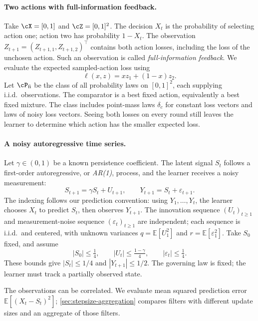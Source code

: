 \documentclass[11pt,twoside]{article}
\newcommand{\E}{\mathbb E}
\theoremstyle{definition}
\theoremstyle{remark}
\begin{document}
\paragraph{Two actions with full-information feedback.}
Take $\cX=[0,1]$ and $\cZ=[0,1]^2$. The decision $X_t$ is the
probability of selecting action one; action two has probability $1-X_t$.
The observation $Z_{t+1}=(Z_{t+1,1},Z_{t+1,2})^\top$ contains both
action losses, including the loss of the unchosen action. Such an
observation is called \emph{full-information feedback}. We evaluate the
expected sampled-action loss using
\begin{equation}
 \ell(x,z)=xz_1+(1-x)z_2.
 \label{eq:mixture-loss}
\end{equation}
Let $\cP_{\rm fi}$ be the class of all probability laws on $[0,1]^2$,
each supplying i.i.d.\ observations. The comparator is a best fixed action,
equivalently a best fixed mixture. The class includes point-mass laws
$\delta_c$ for constant loss vectors and laws of noisy loss vectors. Seeing both losses
on every round still leaves the learner to determine which action has the
smaller expected loss.

\paragraph{A noisy autoregressive time series.}
Let $\gamma\in(0,1)$ be a known persistence coefficient. The latent signal
$S_t$ follows a first-order autoregressive, or \emph{AR(1)}, process, and
the learner receives a noisy measurement:
\begin{equation}
 S_{t+1}=\gamma S_t+U_{t+1},\qquad
 Y_{t+1}=S_t+\varepsilon_{t+1}.
 \label{eq:ar-model}
\end{equation}
The indexing follows our prediction convention: using $Y_1,\ldots,Y_t$,
the learner chooses $X_t$ to predict $S_t$, then observes $Y_{t+1}$.
The innovation sequence $(U_t)_{t\ge1}$ and measurement-noise sequence
$(\varepsilon_t)_{t\ge1}$ are independent; each sequence is i.i.d.\ and
centered, with unknown variances $q=\E[U_1^2]$ and
$r=\E[\varepsilon_1^2]$. Take $S_0$ fixed, and assume
\[
 |S_0|\le\tfrac14,\qquad |U_t|\le\tfrac{1-\gamma}{4},\qquad
 |\varepsilon_t|\le\tfrac14.
\]
These bounds give $|S_t|\le1/4$ and $|Y_{t+1}|\le1/2$.
The governing law is fixed; the learner must track a partially observed state.

The observations can be correlated. We evaluate mean squared prediction
error $\E[(X_t-S_t)^2]$; \cref{sec:stepsize-aggregation} compares filters
with different update sizes and an aggregate of those filters.
\end{document}
